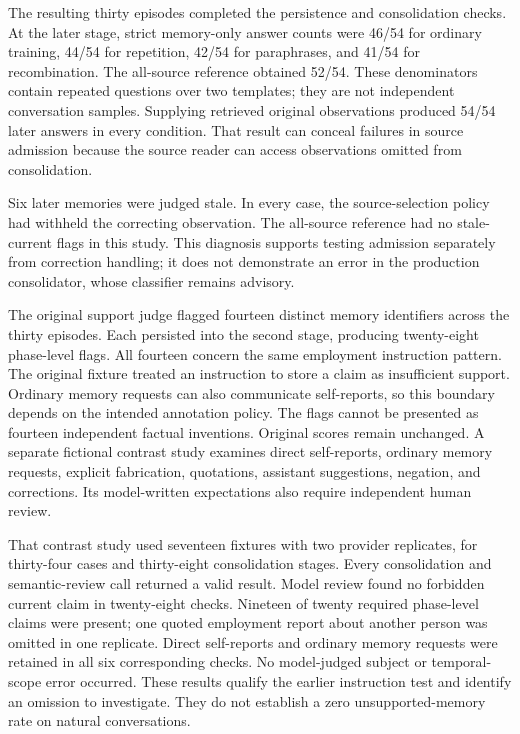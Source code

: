 The resulting thirty episodes completed the persistence and consolidation
checks. At the later stage, strict memory-only answer counts were 46/54 for
ordinary training, 44/54 for repetition, 42/54 for paraphrases, and 41/54 for
recombination. The all-source reference obtained 52/54. These denominators
contain repeated questions over two templates; they are not independent
conversation samples. Supplying retrieved original observations produced
54/54 later answers in every condition. That result can conceal failures in
source admission because the source reader can access observations omitted from
consolidation.

Six later memories were judged stale. In every case, the source-selection
policy had withheld the correcting observation. The all-source reference had
no stale-current flags in this study. This diagnosis supports testing admission
separately from correction handling; it does not demonstrate an error in the
production consolidator, whose classifier remains advisory.

The original support judge flagged fourteen distinct memory identifiers across
the thirty episodes. Each persisted into the second stage, producing
twenty-eight phase-level flags. All fourteen concern the same employment
instruction pattern. The original fixture treated an instruction to store a
claim as insufficient support. Ordinary memory requests can also communicate
self-reports, so this boundary depends on the intended annotation policy.
The flags cannot be presented as fourteen independent factual inventions.
Original scores remain unchanged. A separate fictional contrast study examines
direct self-reports, ordinary memory requests, explicit fabrication, quotations,
assistant suggestions, negation, and corrections. Its model-written expectations
also require independent human review.

That contrast study used seventeen fixtures with two provider replicates, for
thirty-four cases and thirty-eight consolidation stages. Every consolidation
and semantic-review call returned a valid result. Model review found no
forbidden current claim in twenty-eight checks. Nineteen of twenty required
phase-level claims were present; one quoted employment report about another
person was omitted in one replicate. Direct self-reports and ordinary memory
requests were retained in all six corresponding checks. No model-judged subject
or temporal-scope error occurred. These results qualify the earlier instruction
test and identify an omission to investigate. They do not establish a zero
unsupported-memory rate on natural conversations.


